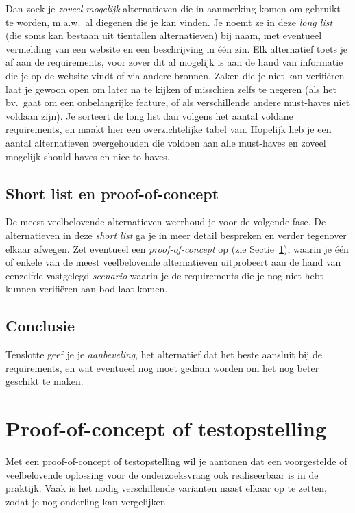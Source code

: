 Dan zoek je \emph{zoveel mogelijk} alternatieven die in aanmerking komen om gebruikt te worden, m.a.w.~al diegenen die je kan vinden. Je noemt ze in deze \emph{long list} (die soms kan bestaan uit tientallen alternatieven) bij naam, met eventueel vermelding van een website en een beschrijving in één zin. Elk alternatief toets je af aan de requirements, voor zover dit al mogelijk is aan de hand van informatie die je op de website vindt of via andere bronnen. Zaken die je niet kan verifiëren laat je gewoon open om later na te kijken of misschien zelfs te negeren (als het bv.~gaat om een onbelangrijke feature, of als verschillende andere must-haves niet voldaan zijn). Je sorteert de long list dan volgens het aantal voldane requirements, en maakt hier een overzichtelijke tabel van. Hopelijk heb je een aantal alternatieven overgehouden die voldoen aan alle must-haves en zoveel mogelijk should-haves en nice-to-haves.

\subsection{Short list en proof-of-concept}%
\label{ssec:short-list-poc}

 De meest veelbelovende alternatieven weerhoud je voor de volgende fase. De alternatieven in deze \emph{short list} ga je in meer detail bespreken en verder tegenover elkaar afwegen. Zet eventueel een \emph{proof-of-concept} op (zie Sectie~\ref{sec:poc-testopstelling}), waarin je één of enkele van de meest veelbelovende alternatieven uitprobeert aan de hand van eenzelfde vastgelegd \emph{scenario} waarin je de requirements die je nog niet hebt kunnen verifiëren aan bod laat komen.

\subsection{Conclusie}%
\label{ssec:vgl-studie-conclusie}

Tenslotte geef je je \emph{aanbeveling}, het alternatief dat het beste aansluit bij de requirements, en wat eventueel nog moet gedaan worden om het nog beter geschikt te maken.

\section{Proof-of-concept of testopstelling}%
\label{sec:poc-testopstelling}

Met een proof-of-concept of testopstelling wil je aantonen dat een voorgestelde of veelbelovende oplossing voor de onderzoeksvraag ook realiseerbaar is in de praktijk. Vaak is het nodig verschillende varianten naast elkaar op te zetten, zodat je nog onderling kan vergelijken.


